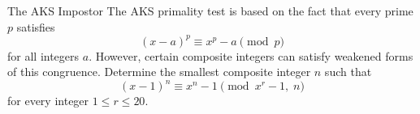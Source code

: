 \begin{problem}{The AKS Impostor}
    The AKS primality test is based on the fact that every prime \(p\) satisfies
    \[
    (x-a)^p \equiv x^p-a \pmod p
    \]
    for all integers \(a\). However, certain composite integers can satisfy weakened forms of this congruence.
    Determine the smallest composite integer \(n\) such that
    \[
    (x-1)^n \equiv x^n-1
    \pmod{x^r-1,\; n}
    \]
    for every integer \(1 \le r \le 20\).
    
\end{problem}
